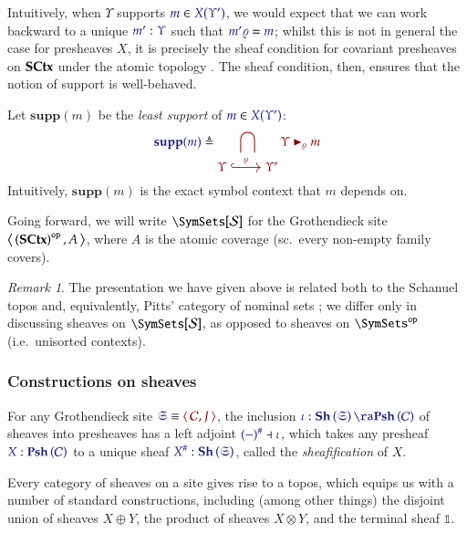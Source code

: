\documentclass[11pt]{article}
\theoremstyle{definition}
\theoremstyle{remark}
\newtheorem{remark}[thm]{Remark}
\numberwithin{equation}{section}
\newcommand\Supp[1]{\mathbf{supp}(#1)}
\newcommand\SupportsUnmoded[3]{#1 \blacktriangleright_{#2} #3}
\newcommand\Sheaves[1]{\mathbf{Sh}\left(#1\right)}
\newcommand\Presheaves[1]{\mathbf{Psh}\left(#1\right)}
\newcommand\Sheafify[1]{#1^{\#}}
\newcommand\SCtxSite{\SymSets[\Sorts]}
\begin{document}
Intuitively, when $\Upsilon$ supports $\Member{m}{X(\Upsilon')}$, we would
expect that we can work backward to a unique $\Of{m'}{\Upsilon}$ such that
$\IsEq{m'\varrho}{m}$; whilst this is not in general the case for presheaves
$X$, it is precisely the sheaf condition for covariant presheaves on $\mathbf{SCtx}$
under the atomic topology \cite[p.~126]{mac-lane-moerdijk:1992}. The sheaf
condition, then, ensures that the notion of support is well-behaved.

Let $\Supp{m}$ be the \emph{least support} of $\Member{m}{X(\Upsilon')}$:
\[
  \Define{\Supp{m}}{
    \bigcap_{
      \begin{tikzcd}[cramped, ampersand replacement = \&]
        \Upsilon\arrow[r, hook, "\varrho"] \& \Upsilon'
      \end{tikzcd}
    }
    \SupportsUnmoded{\Upsilon}{\varrho}{m}
  }
\]
Intuitively, $\Supp{m}$ is the exact symbol context that $m$ depends on.

Going forward, we will write $\SCtxSite$ for the Grothendieck site
$\left\langle\,\left(\mathbf{SCtx}\right)^{\mathtt{op}},A\,\right\rangle$, where $A$ is the atomic coverage (sc.\
every non-empty family covers).

\begin{remark}
  The presentation we have given above is related both to the Schanuel topos
  and, equivalently, Pitts' category of nominal sets \cite{fiore-staton:2006}; we differ only in
  discussing sheaves on $\SCtxSite$, as
  opposed to sheaves on $\OpCat{\SymSets}$ (i.e.\ unisorted contexts).
\end{remark}

\subsubsection{Constructions on sheaves}

For any Grothendieck site $\Match{\mathfrak{S}}{\Pair{\mathcal{C}}{J}}$, the
inclusion $\Of{\iota}{\Sheaves{\mathfrak{S}}\ra\Presheaves{\mathcal{C}}}$ of
sheaves into presheaves has a left adjoint
$\IMode{\Sheafify{(-)}}\dashv\IMode{\iota}$, which takes any presheaf
$\Of{X}{\Presheaves{\mathcal{C}}}$ to a unique sheaf
$\Of{\Sheafify{X}}{\Sheaves{\mathfrak{S}}}$, called the \emph{sheafification}
of $X$.

Every category of sheaves on a site gives rise to a topos, which equips us with
a number of standard constructions, including (among other things) the disjoint
union of sheaves $X\oplus Y$, the product of sheaves $X\otimes Y$, and the terminal sheaf $\mathbb{1}$.
\end{document}
